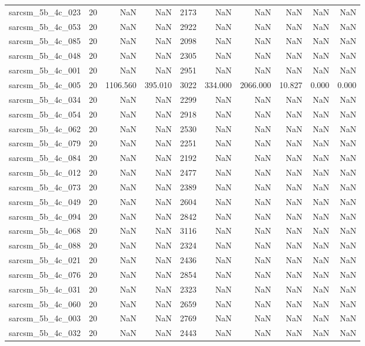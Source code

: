 \begin{tabular}{lrrrrrrrrr}
sarcsm\_5b\_4c\_023 & 20 & NaN & NaN & 2173 & NaN & NaN & NaN & NaN & NaN \\
sarcsm\_5b\_4c\_053 & 20 & NaN & NaN & 2922 & NaN & NaN & NaN & NaN & NaN \\
sarcsm\_5b\_4c\_085 & 20 & NaN & NaN & 2098 & NaN & NaN & NaN & NaN & NaN \\
sarcsm\_5b\_4c\_048 & 20 & NaN & NaN & 2305 & NaN & NaN & NaN & NaN & NaN \\
sarcsm\_5b\_4c\_001 & 20 & NaN & NaN & 2951 & NaN & NaN & NaN & NaN & NaN \\
sarcsm\_5b\_4c\_005 & 20 & 1106.560 & 395.010 & 3022 & 334.000 & 2066.000 & 10.827 & 0.000 & 0.000 \\
sarcsm\_5b\_4c\_034 & 20 & NaN & NaN & 2299 & NaN & NaN & NaN & NaN & NaN \\
sarcsm\_5b\_4c\_054 & 20 & NaN & NaN & 2918 & NaN & NaN & NaN & NaN & NaN \\
sarcsm\_5b\_4c\_062 & 20 & NaN & NaN & 2530 & NaN & NaN & NaN & NaN & NaN \\
sarcsm\_5b\_4c\_079 & 20 & NaN & NaN & 2251 & NaN & NaN & NaN & NaN & NaN \\
sarcsm\_5b\_4c\_084 & 20 & NaN & NaN & 2192 & NaN & NaN & NaN & NaN & NaN \\
sarcsm\_5b\_4c\_012 & 20 & NaN & NaN & 2477 & NaN & NaN & NaN & NaN & NaN \\
sarcsm\_5b\_4c\_073 & 20 & NaN & NaN & 2389 & NaN & NaN & NaN & NaN & NaN \\
sarcsm\_5b\_4c\_049 & 20 & NaN & NaN & 2604 & NaN & NaN & NaN & NaN & NaN \\
sarcsm\_5b\_4c\_094 & 20 & NaN & NaN & 2842 & NaN & NaN & NaN & NaN & NaN \\
sarcsm\_5b\_4c\_068 & 20 & NaN & NaN & 3116 & NaN & NaN & NaN & NaN & NaN \\
sarcsm\_5b\_4c\_088 & 20 & NaN & NaN & 2324 & NaN & NaN & NaN & NaN & NaN \\
sarcsm\_5b\_4c\_021 & 20 & NaN & NaN & 2436 & NaN & NaN & NaN & NaN & NaN \\
sarcsm\_5b\_4c\_076 & 20 & NaN & NaN & 2854 & NaN & NaN & NaN & NaN & NaN \\
sarcsm\_5b\_4c\_031 & 20 & NaN & NaN & 2323 & NaN & NaN & NaN & NaN & NaN \\
sarcsm\_5b\_4c\_060 & 20 & NaN & NaN & 2659 & NaN & NaN & NaN & NaN & NaN \\
sarcsm\_5b\_4c\_003 & 20 & NaN & NaN & 2769 & NaN & NaN & NaN & NaN & NaN \\
sarcsm\_5b\_4c\_032 & 20 & NaN & NaN & 2443 & NaN & NaN & NaN & NaN & NaN \\

\end{tabular}
